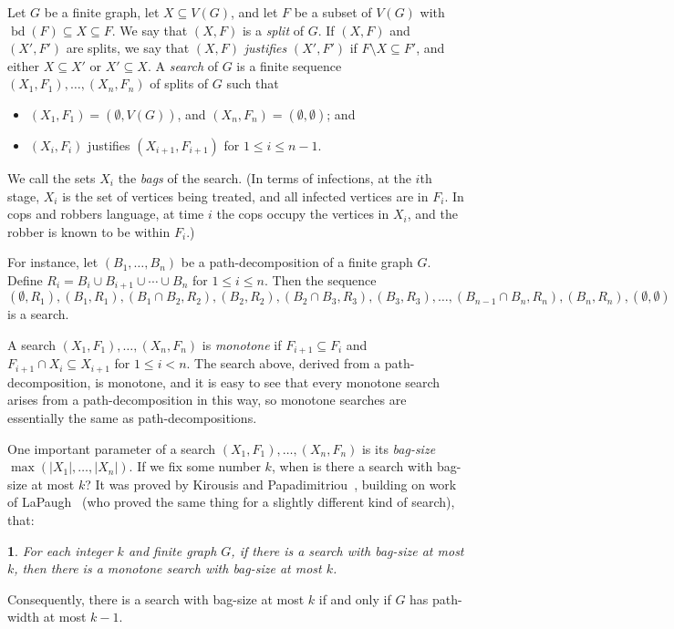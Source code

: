 \documentclass[titlepage,11pt]{article}
\def\LL{,\ldots,}
\newcommand{\cupcup}{\cup \cdots\cup}
\newcommand{\bd}{\operatorname{bd}}
\newtheorem{thm}{}[section]
\begin{document}
	Let $G$ be a finite graph, let $X\subseteq V(G)$, and let $F$ be a subset of $V(G)$ with $\bd(F)\subseteq X\subseteq F$.
	We say that $(X,F)$ is a {\em split} of $G$. If $(X,F)$ and $(X',F')$ are splits,
	we say that $(X,F)$ {\em justifies} $(X',F')$ if $F\setminus X\subseteq F'$, and either $X\subseteq X'$ or $X'\subseteq X$.
	A {\em search} of $G$ is a finite sequence $(X_1,F_1)\LL (X_n,F_n)$ of splits of $G$ such that
	\begin{itemize}
		\item $(X_1,F_1) = (\emptyset,V(G))$, and $(X_n,F_n) = (\emptyset, \emptyset)$; and
		\item $(X_i,F_i)$ justifies $(X_{i+1},F_{i+1})$ for $1\le i\le n-1$.
	\end{itemize}
	We call the sets $X_i$ the {\em bags} of the search. (In terms of infections, at the $i$th stage, $X_i$ is the set of vertices
	being treated, and all infected vertices are in $F_i$. In cops and robbers language, at time $i$ the cops occupy the vertices in $X_i$,
	and the robber is known to be within $F_i$.)
	
	
	For instance, let $(B_1\LL B_n)$ be a path-decomposition of a finite graph $G$. Define $R_i = B_i\cup B_{i+1}\cupcup B_n$
	for $1\le i\le n$. Then the sequence
	$$(\emptyset,R_1),(B_1, R_1), (B_1\cap B_2, R_2), (B_2,R_2), (B_2\cap B_3, R_3),(B_3,R_3)\LL (B_{n-1}\cap B_n, R_{n}), (B_n,R_n), (\emptyset,\emptyset)$$
	is a search.
	
	A search $(X_1,F_1)\LL (X_n,F_n)$ is {\em monotone} if $F_{i+1}\subseteq F_i$ and $F_{i+1}\cap X_i\subseteq X_{i+1}$ for $1\le i<n$.
	The search above, derived from a path-decomposition, is monotone, and it is easy to see that every monotone search arises from a
	path-decomposition in this way, so monotone searches are essentially the same as path-decompositions.
	
	One important parameter of a search $(X_1,F_1)\LL (X_n,F_n)$ is its {\em bag-size} $\max(|X_1|\LL |X_n|)$. If we fix some number $k$, when is there a
	search with bag-size at most $k$? It was proved by Kirousis and
	Papadimitriou~\cite{kirousis1,kirousis2}, building on work of LaPaugh~\cite{lapaugh} (who proved the same thing for a slightly different kind of search), that:
	\begin{thm}\label{getmonotone}
		For each integer $k$ and finite graph $G$, if there is a search with bag-size at most $k$,
		then there is a monotone search with bag-size at most $k$.
	\end{thm}
	Consequently, there is a search with bag-size at most $k$ if and only if $G$ has path-width at most $k-1$.
	
\end{document}
